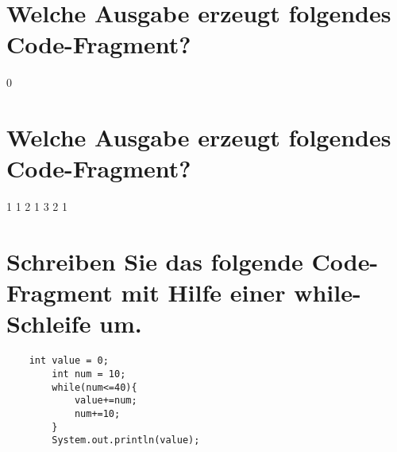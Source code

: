 \documentclass{article}
\begin{document}
\section{Welche Ausgabe erzeugt folgendes Code-Fragment?}
0\newline
\section{Welche Ausgabe erzeugt folgendes Code-Fragment?}
1 1 2 1 3 2 1\newline
\section{Schreiben Sie das folgende Code-Fragment mit Hilfe einer while-Schleife um.}
\begin{verbatim}
    int value = 0;
        int num = 10;
        while(num<=40){
            value+=num;
            num+=10;
        }
        System.out.println(value);
\end{verbatim}
\end{document}
